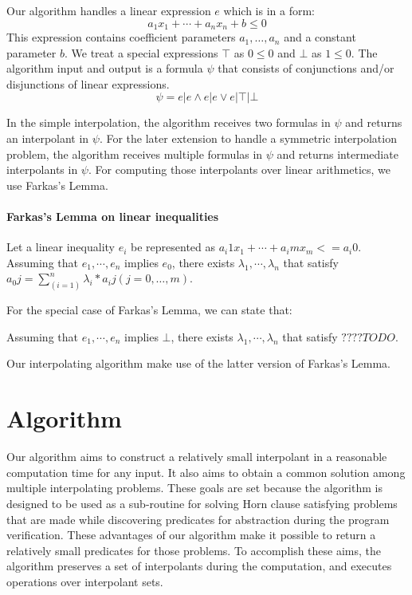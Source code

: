 Our algorithm handles a linear expression $e$ which is in a form:
\[ a_1 x_1 + \cdots + a_n x_n + b \leq 0 \]
This expression contains coefficient parameters $a_1, \ldots, a_n$ and
a constant parameter $b$.  We treat a special expressions $\top$ as $0
\leq 0$ and $\bot$ as $1 \leq 0$.  The algorithm input and output is a
formula $\psi$ that consists of conjunctions and/or disjunctions of
linear expressions.
\[ \psi = e | e \wedge e | e \vee e | \top | \bot \]

In the simple interpolation, the algorithm receives two formulas in
$\psi$ and returns an interpolant in $\psi$.  For the later extension
to handle a symmetric interpolation problem, the algorithm receives
multiple formulas in $\psi$ and returns intermediate interpolants in
$\psi$.  For computing those interpolants over linear arithmetics, we
use Farkas's Lemma.


\paragraph{Farkas's Lemma on linear inequalities}
Let a linear inequality $e_i$ be represented as $a_i1 x_1 + \cdots +
a_im x_m <= a_i0$.  Assuming that $e_1,\cdots,e_n$ implies $e_0$,
there exists $\lambda_1,\cdots,\lambda_n$ that satisfy $a_0j
=\sum_(i=1)^n \lambda_i * a_ij (j=0, \ldots, m)$.

For the special case of Farkas's Lemma, we can state that:

Assuming that $e_1,\cdots,e_n$ implies $\bot$, there exists
$\lambda_1,\cdots,\lambda_n$ that satisfy $???? TODO $.

Our interpolating algorithm make use of the latter version of Farkas's
Lemma.


\section{Algorithm}

Our algorithm aims to construct a relatively small interpolant in a
reasonable computation time for any input.  It also aims to obtain a
common solution among multiple interpolating problems.  These goals
are set because the algorithm is designed to be used as a sub-routine
for solving Horn clause satisfying problems
that are made while discovering predicates for abstraction
during the program verification.  These advantages of our algorithm
make it possible to return a relatively small predicates for those
problems. To accomplish these aims, the algorithm preserves a set of
interpolants during the computation, and executes operations
over interpolant sets.


